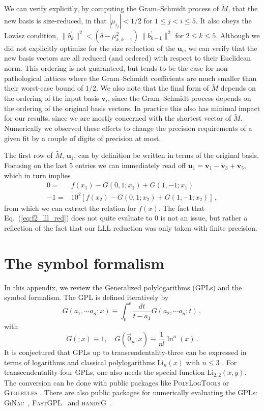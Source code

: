 \documentclass[a4paper,11pt]{article}
\newcommand{\Li}{\text{Li}}
\begin{document}
We can verify explicitly, by computing the Gram–Schmidt process of $\tilde{M}$, that the new basis is size-reduced, in that $|\mu_{i_j}|<1/2$ for $ 1\leq j < i \leq 5$. It also obeys the Lov\'asz  condition, $\| b_k^\prime\|^2 < (\delta - \mu_{k,k-1}^2)\,\| b_{k-1}^\prime\|^2$ for $2\leq k\leq 5$. Although we did not explicitly optimize for the size reduction of the $\mathbf{u}_i$, we can verify that the new basis vectors are all reduced (and ordered) with respect to their Euclidean norm. This ordering is not guaranteed, but tends to be the case for non-pathological lattices where the Gram–Schmidt coefficients are much smaller than their worst-case bound of $1/2$. We also note that the final form of $\tilde{M}$ depends on the ordering of the input basis $\mathbf{v}_i$, since the Gram–Schmidt process depends on the ordering of the original basis vectors. In practice this also has minimal impact for our results, since we are mostly concerned with the shortest vector of $\tilde{M}$. Numerically we observed these effects to change the precision requirements of a given fit by a couple of digits of precision at most.

The first row of $\tilde{M}$, $\mathbf{u}_1$, can by definition be written in terms of the original basis. Focusing on the last 5 entries we can immediately read off $\mathbf{u}_1 = \mathbf{v}_1 - \mathbf{v}_3 + \mathbf{v}_5$, which in turn implies 
\begin{align}
    0 =&  f(x_1) - G(0,1;x_1) + G(1,-1;x_1) \\
    -1 =&  10^2 \left[f(x_2) - G(0,1;x_2) + G(1,-1;x_2) \right] \label{eq:f2_lll_red} \,, 
\end{align}
from which we can extract the relation for $f(x)$. The fact that Eq.~(\ref{eq:f2_lll_red}) does not quite evaluate to 0 is not an issue, but rather a reflection of the fact that our LLL reduction was only taken with finite precision.


\section{The symbol formalism}\label{sec:symbols}

In this appendix, we review the Generalized polylogarithms (GPLs) and the symbol formalism. The GPL is defined iteratively by 
\begin{equation}\label{eq:gpl_def}
G(a_1,\cdots a_n; x)\equiv\int_0^x \frac{dt}{t-a_1} G(a_2,\cdots a_n; t)\,,
\end{equation}
with
\begin{equation}
G(;x)\equiv1,\quad G(\vec 0_n;x)\equiv\frac{1}{n!}\ln^n (x)\,.
\end{equation}
It is conjectured that GPLs up to transcendentality-three can be expressed in terms of logarithms and classical polylogarithms $\Li_n(x)$ with $n\leq 3$ \cite{Duhr:2011zq}. For transcendentality-four GPLs, one also needs the special function $\Li_{2,2}(x,y)$. The conversion can be done with public packages like \textsc{PolyLogTools} \cite{Duhr:2019tlz} or \textsc{Gtolrules} \cite{Frellesvig:2016ske}. There are also public packages for numerically evaluating the GPLs: \textsc{GiNac}~\cite{Bauer:2002, Vollinga:2004sn}, \textsc{FastGPL}~\cite{Wang:2021imw} and \textsc{handyG}~\cite{Naterop:2019xaf}.
\end{document}
